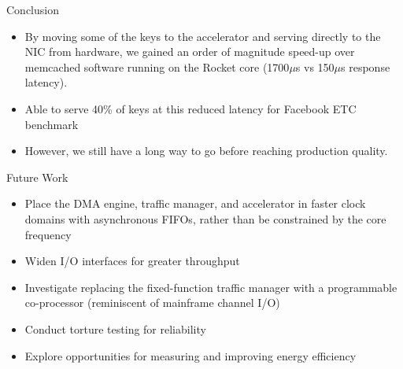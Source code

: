 \begin{block}{Conclusion}
\footnotesize
\begin{itemize}
    \item By moving some of the keys to the accelerator and serving directly
        to the NIC from hardware, we gained an order of magnitude speed-up
        over memcached software running on the Rocket core (1700$\mu$s vs 150$\mu$s response latency).
    \item Able to serve 40\% of keys at this reduced latency for Facebook ETC benchmark
    \item However, we still have a long way to go before reaching
        production quality.
\end{itemize}
\end{block}

\vspace{1ex}

\begin{block}{Future Work}
\footnotesize
\begin{itemize}
    \item Place the DMA engine, traffic manager, and accelerator in
	faster clock domains with asynchronous FIFOs, rather than be
	constrained by the core frequency
    \item Widen I/O interfaces for greater throughput
    \item Investigate replacing the fixed-function traffic manager with
        a programmable co-processor (reminiscent of mainframe channel I/O)
    \item Conduct torture testing for reliability
    \item Explore opportunities for measuring and improving energy efficiency
\end{itemize}
\end{block}
